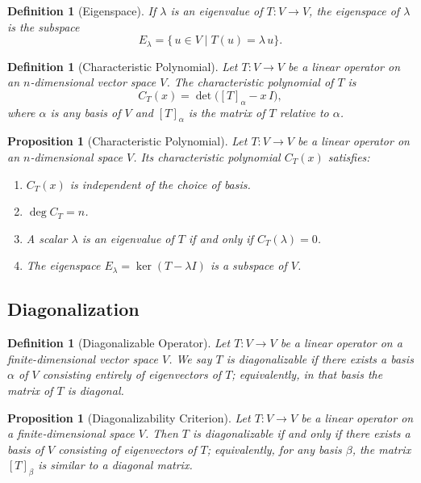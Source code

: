 \documentclass[12pt]{article}
\theoremstyle{break}             %
\newtheorem{prop}[thm]{Proposition}%
\newtheorem{defn}[thm]{Definition}
\begin{document}
\begin{defn}[Eigenspace]
If \(\lambda\) is an eigenvalue of \(T\colon V\to V\), the \emph{eigenspace} of \(\lambda\) is the subspace
\[
E_\lambda
=\{\,u\in V \mid T(u)=\lambda\,u\}.
\]
\end{defn}

\begin{defn}[Characteristic Polynomial]
Let \(T\colon V\to V\) be a linear operator on an \(n\)-dimensional vector space \(V\).  The \emph{characteristic polynomial} of \(T\) is
\[
C_T(x)
=\det\bigl([T]_\alpha - x\,I\bigr),
\]
where \(\alpha\) is any basis of \(V\) and \([T]_\alpha\) is the matrix of \(T\) relative to \(\alpha\).
\end{defn}

\begin{prop}[Characteristic Polynomial]
Let \(T:V\to V\) be a linear operator on an \(n\)-dimensional space \(V\).  Its characteristic polynomial \(C_T(x)\) satisfies:
\begin{enumerate}
  \item \(C_T(x)\) is independent of the choice of basis.
  \item \(\deg C_T = n\).
  \item A scalar \(\lambda\) is an eigenvalue of \(T\) if and only if \(C_T(\lambda)=0\).
  \item The eigenspace \(E_\lambda = \ker(T-\lambda I)\) is a subspace of \(V\).
\end{enumerate}
\end{prop}

\subsection{Diagonalization}

\begin{defn}[Diagonalizable Operator]
Let \(T\colon V\to V\) be a linear operator on a finite-dimensional vector space \(V\).  We say \(T\) is \emph{diagonalizable} if there exists a basis \(\alpha\) of \(V\) consisting entirely of eigenvectors of \(T\); equivalently, in that basis the matrix of \(T\) is diagonal.
\end{defn}

\begin{prop}[Diagonalizability Criterion]
Let \(T:V\to V\) be a linear operator on a finite‐dimensional space \(V\).  Then \(T\) is diagonalizable if and only if there exists a basis of \(V\) consisting of eigenvectors of \(T\); equivalently, for any basis \(\beta\), the matrix \([T]_\beta\) is similar to a diagonal matrix.
\end{prop}
\end{document}
